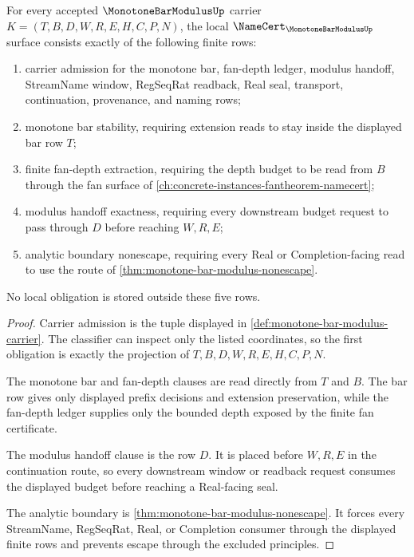 \begin{theorem}
\label{thm:monotone-bar-modulus-namecert-obligations}
For every accepted $\MonotoneBarModulusUp$ carrier $K=(T,B,D,W,R,E,H,C,P,N)$, the local $\NameCert_{\MonotoneBarModulusUp}$ surface consists exactly of the following finite rows:
\begin{enumerate}
\item carrier admission for the monotone bar, fan-depth ledger, modulus handoff, StreamName window, RegSeqRat readback, Real seal, transport, continuation, provenance, and naming rows;
\item monotone bar stability, requiring extension reads to stay inside the displayed bar row $T$;
\item finite fan-depth extraction, requiring the depth budget to be read from $B$ through the fan surface of \autoref{ch:concrete-instances-fantheorem-namecert};
\item modulus handoff exactness, requiring every downstream budget request to pass through $D$ before reaching $W,R,E$;
\item analytic boundary nonescape, requiring every Real or Completion-facing read to use the route of \autoref{thm:monotone-bar-modulus-nonescape}.
\end{enumerate}
No local obligation is stored outside these five rows.
\end{theorem}
\begin{proof}
Carrier admission is the tuple displayed in \autoref{def:monotone-bar-modulus-carrier}. The classifier can inspect only the listed coordinates, so the first obligation is exactly the projection of $T,B,D,W,R,E,H,C,P,N$.

The monotone bar and fan-depth clauses are read directly from $T$ and $B$. The bar row gives only displayed prefix decisions and extension preservation, while the fan-depth ledger supplies only the bounded depth exposed by the finite fan certificate.

The modulus handoff clause is the row $D$. It is placed before $W,R,E$ in the continuation route, so every downstream window or readback request consumes the displayed budget before reaching a Real-facing seal.

The analytic boundary is \autoref{thm:monotone-bar-modulus-nonescape}. It forces every StreamName, RegSeqRat, Real, or Completion consumer through the displayed finite rows and prevents escape through the excluded principles.
\end{proof}


